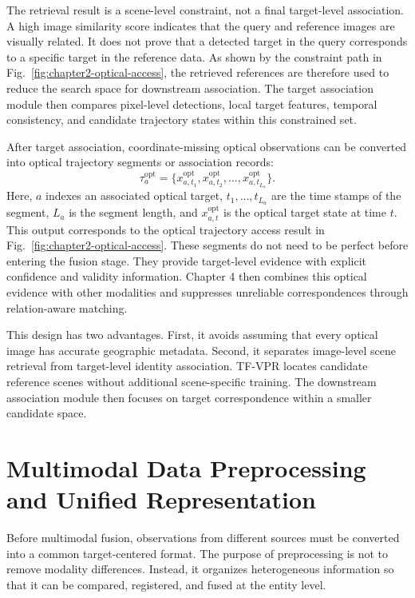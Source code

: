 The retrieval result is a scene-level constraint, not a final target-level association. A high image similarity score indicates that the query and reference images are visually related. It does not prove that a detected target in the query corresponds to a specific target in the reference data. As shown by the constraint path in Fig.~\ref{fig:chapter2-optical-access}, the retrieved references are therefore used to reduce the search space for downstream association. The target association module then compares pixel-level detections, local target features, temporal consistency, and candidate trajectory states within this constrained set.

After target association, coordinate-missing optical observations can be converted into optical trajectory segments or association records:
\begin{equation}
  \tau^{\mathrm{opt}}_a
  =
  \{x^{\mathrm{opt}}_{a,t_1},x^{\mathrm{opt}}_{a,t_2},\ldots,x^{\mathrm{opt}}_{a,t_{L_a}}\}.
\end{equation}
Here, \(a\) indexes an associated optical target, \(t_1,\ldots,t_{L_a}\) are the time stamps of the segment, \(L_a\) is the segment length, and \(x^{\mathrm{opt}}_{a,t}\) is the optical target state at time \(t\). This output corresponds to the optical trajectory access result in Fig.~\ref{fig:chapter2-optical-access}. These segments do not need to be perfect before entering the fusion stage. They provide target-level evidence with explicit confidence and validity information. Chapter 4 then combines this optical evidence with other modalities and suppresses unreliable correspondences through relation-aware matching.

This design has two advantages. First, it avoids assuming that every optical image has accurate geographic metadata. Second, it separates image-level scene retrieval from target-level identity association. TF-VPR locates candidate reference scenes without additional scene-specific training. The downstream association module then focuses on target correspondence within a smaller candidate space.

\section{Multimodal Data Preprocessing and Unified Representation}
Before multimodal fusion, observations from different sources must be converted into a common target-centered format. The purpose of preprocessing is not to remove modality differences. Instead, it organizes heterogeneous information so that it can be compared, registered, and fused at the entity level.

